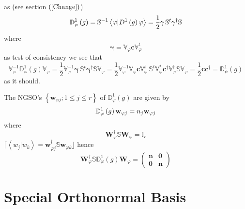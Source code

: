 \documentclass[aps,preprint]{revtex4}
\begin{document}
as (see section $\left( \ref{Change}\right) $) 
\begin{equation}
\mathbb{D}_{\varphi }^{1}\left( g\right) =\mathbb{S}^{-1}\left\langle 
\mathbf{\varphi }|D^{1}\left( g\right) \mathbf{\varphi }\right\rangle =\frac{%
1}{2}\mathbf{\gamma \,}\mathbb{S}^{t}\mathbf{\gamma }^{\dagger }\mathbb{S}
\end{equation}%
where 
\begin{equation}
\mathbf{\gamma }=\mathbb{V}_{\varphi }\mathbf{c}\mathbb{V}_{\varphi }^{t}
\end{equation}%
as test of consistency we see that 
\begin{equation}
\mathbb{V}_{\varphi }^{-1}\mathbb{D}_{\varphi }^{1}\left( g\right) \mathbb{V}%
_{\varphi }=\frac{1}{2}\mathbb{V}_{\varphi }^{-1}\mathbf{\gamma \,}\mathbb{S}%
^{t}\mathbf{\gamma }^{\dagger }\mathbb{SV}_{\varphi }=\frac{1}{2}\mathbb{V}%
_{\varphi }^{-1}\mathbb{V}_{\varphi }\mathbf{c}\mathbb{V}_{\varphi }^{t}%
\mathbf{\,}\mathbb{S}^{t}\mathbb{V}_{\varphi }^{\ast }\mathbf{c}^{\dagger }%
\mathbb{V}_{\varphi }^{\dagger }\mathbb{SV}_{\varphi }=\frac{1}{2}\mathbf{cc}%
^{\dagger }=\mathbb{D}_{\psi }^{1}\left( g\right)
\end{equation}%
as it should.

The NGSO's $\left\{ \mathbf{w}_{\varphi j};1\leq j\leq r\right\} $ of $%
\mathbb{D}_{\varphi }^{1}\left( g\right) $ are given by 
\begin{equation}
\mathbb{D}_{\varphi }^{1}\left( g\right) \mathbf{w}_{\varphi j}=n_{j}\mathbf{%
w}_{\varphi j}
\end{equation}%
where 
\begin{equation}
\mathbf{W}_{\varphi }^{\dagger }\mathbb{S}\mathbf{W}_{\varphi }=\mathbb{I}%
_{r}
\end{equation}%
$\lceil \left\langle w_{j}|w_{k}\right\rangle =\mathbf{w}_{\varphi
j}^{\dagger }\mathbb{S}\mathbf{w}_{\varphi k}\rfloor $ hence%
\begin{equation}
\mathbf{W}_{\varphi }^{\dagger }\mathbb{SD}_{\varphi }^{1}\left( g\right) 
\mathbf{W}_{\varphi }=\left( 
\begin{array}{cc}
\mathbf{n} & \mathbf{0} \\ 
\mathbf{0} & \mathbf{n}%
\end{array}%
\right)
\end{equation}

\section{Special Orthonormal Basis\label{Special}}
\end{document}
